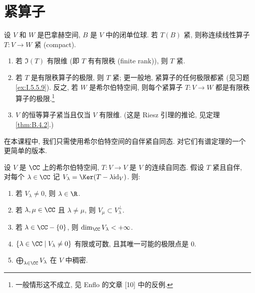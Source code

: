 
\section{紧算子}

\begin{definition}
\label{def:IV.1.1}
设 $V$ 和 $W$ 是巴拿赫空间, $B$ 是 $V$ 中的闭单位球. 若 $T(B)$ 紧, 则称连续线性算子 $T \colon V \to W$ 紧 (compact).
\end{definition}

\begin{example}[紧算子的例子]
\label{exa:IV.1.2}
\begin{enumerate}
\item[(1)] 若 $\Im(T)$ 有限维 (即 $T$ 有有限秩 (finite rank)), 则 $T$ 紧.
\item[(2)] 若 $T$ 是有限秩算子的极限, 则 $T$ 紧; 更一般地, 紧算子的任何极限都紧 (见习题 \ref{ex:I.5.5.9}).
  反之, 若 $W$ 是希尔伯特空间, 则每个紧算子 $T \colon V \to W$ 都是有限秩算子的极限.\footnote{一般情形这不成立, 见 Enflo 的文章 {[}10{]} 中的反例.}
\item[(3)] $V$ 的恒等算子紧当且仅当 $V$ 有限维. (这是 Riesz 引理的推论, 见定理 \ref{thm:B.4.2}.)
\end{enumerate}
\end{example}

在本课程中, 我们只需使用希尔伯特空间的自伴紧自同态. 对它们有谱定理的一个更简单的版本.

\begin{theorem}
\label{thm:IV.1.3}
设 $V$ 是 $\CC$ 上的希尔伯特空间, $T \colon V \to V$ 是 $V$ 的连续自同态. 假设 $T$ 紧且自伴, 对每个 $\lambda \in \CC$ 记 $V_{\lambda} = \Ker(T - \lambda\mathrm{id}_V)$.
则:
\begin{enumerate}
\item[(i)] 若 $V_{\lambda} \neq 0$, 则 $\lambda \in \R$.
\item[(ii)] 若 $\lambda, \mu \in \CC$ 且 $\lambda \neq \mu$, 则 $V_{\mu} \subset V_{\lambda}^{\perp}$.
\item[(iii)] 若 $\lambda \in \CC - \{0\}$, 则 $\dim_{\CC}V_{\lambda} < +\infty$.
\item[(iv)] $\{\lambda \in \CC \mid V_{\lambda} \neq 0\}$ 有限或可数, 且其唯一可能的极限点是 $0$.
\item[(v)] $\bigoplus_{\lambda \in \CC}V_{\lambda}$ 在 $V$ 中稠密.
\end{enumerate}
\end{theorem}

